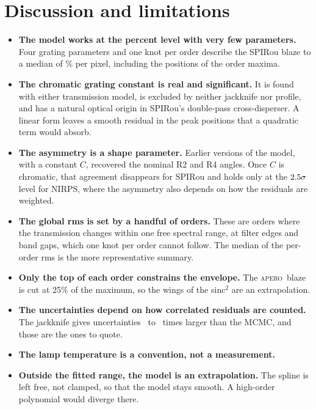 \documentclass[11pt,a4paper]{article}
\newcommand{\apero}{\textsc{apero}}
\begin{document}
\section{Discussion and limitations}
\label{sec:discussion}

\begin{itemize}
\item \textbf{The model works at the percent level with very few parameters.} Four grating parameters and one knot per order describe the SPIRou blaze to a median of \spMedRel\% per pixel, including the positions of the order maxima.
\item \textbf{The chromatic grating constant is real and significant.} It is found with either transmission model, is excluded by neither jackknife nor profile, and has a natural optical origin in SPIRou's double-pass cross-disperser. A linear form leaves a smooth residual in the peak positions that a quadratic term would absorb.
\item \textbf{The asymmetry is a shape parameter.} Earlier versions of the model, with a constant $C$, recovered the nominal R2 and R4 angles. Once $C$ is chromatic, that agreement disappears for SPIRou and holds only at the $2.5\sigma$ level for NIRPS, where the asymmetry also depends on how the residuals are weighted.
\item \textbf{The global rms is set by a handful of orders.} These are orders where the transmission changes within one free spectral range, at filter edges and band gaps, which one knot per order cannot follow. The median of the per-order rms is the more representative summary.
\item \textbf{Only the top of each order constrains the envelope.} The \apero\ blaze is cut at 25\% of the maximum, so the wings of the sinc$^2$ are an extrapolation.
\item \textbf{The uncertainties depend on how correlated residuals are counted.} The jackknife gives uncertainties \MinRatio\ to \MaxRatio\ times larger than the MCMC, and those are the ones to quote.
\item \textbf{The lamp temperature is a convention, not a measurement.}
\item \textbf{Outside the fitted range, the model is an extrapolation.} The spline is left free, not clamped, so that the model stays smooth. A high-order polynomial would diverge there.
\end{itemize}

\end{document}
